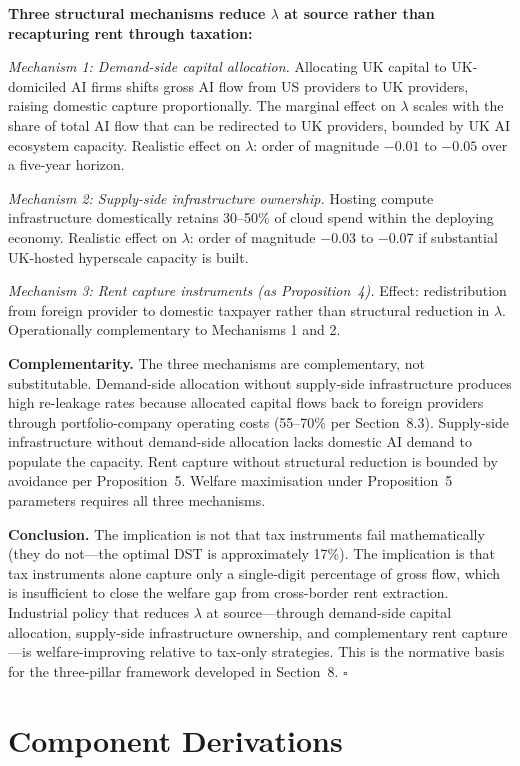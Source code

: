 \documentclass[11pt,letterpaper]{article}
\theoremstyle{remark}
\begin{document}
\textbf{Three structural mechanisms reduce $\lambda$ at source rather than recapturing rent through taxation:}

\textit{Mechanism 1: Demand-side capital allocation.} Allocating UK capital to UK-domiciled AI firms shifts gross AI flow from US providers to UK providers, raising domestic capture proportionally. The marginal effect on $\lambda$ scales with the share of total AI flow that can be redirected to UK providers, bounded by UK AI ecosystem capacity. Realistic effect on $\lambda$: order of magnitude $-0.01$ to $-0.05$ over a five-year horizon.

\textit{Mechanism 2: Supply-side infrastructure ownership.} Hosting compute infrastructure domestically retains 30--50\% of cloud spend within the deploying economy. Realistic effect on $\lambda$: order of magnitude $-0.03$ to $-0.07$ if substantial UK-hosted hyperscale capacity is built.

\textit{Mechanism 3: Rent capture instruments (as Proposition~4).} Effect: redistribution from foreign provider to domestic taxpayer rather than structural reduction in $\lambda$. Operationally complementary to Mechanisms 1 and 2.

\textbf{Complementarity.} The three mechanisms are complementary, not substitutable. Demand-side allocation without supply-side infrastructure produces high re-leakage rates because allocated capital flows back to foreign providers through portfolio-company operating costs (55--70\% per Section~8.3). Supply-side infrastructure without demand-side allocation lacks domestic AI demand to populate the capacity. Rent capture without structural reduction is bounded by avoidance per Proposition~5. Welfare maximisation under Proposition~5 parameters requires all three mechanisms.

\textbf{Conclusion.} The implication is not that tax instruments fail mathematically (they do not---the optimal DST is approximately 17\%). The implication is that tax instruments alone capture only a single-digit percentage of gross flow, which is insufficient to close the welfare gap from cross-border rent extraction. Industrial policy that reduces $\lambda$ at source---through demand-side capital allocation, supply-side infrastructure ownership, and complementary rent capture---is welfare-improving relative to tax-only strategies. This is the normative basis for the three-pillar framework developed in Section~8. \hfill$\square$

\section{Component Derivations}
\end{document}
